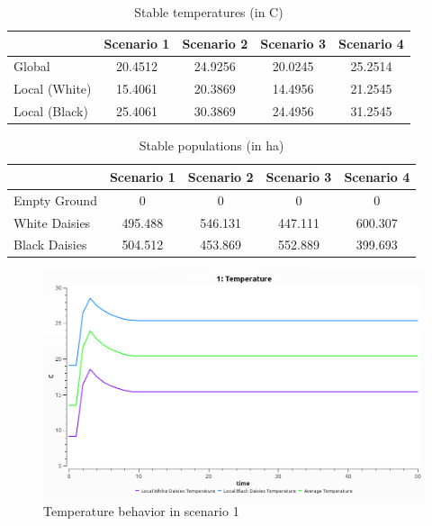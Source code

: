 \documentclass[12pt,a4paper,parskip]{scrartcl}
\begin{document}
\begin{table}
    \centering
    \begin{tabular}{l|c|c|c|c}
                      & Scenario 1 & Scenario 2 & Scenario 3 & Scenario 4\\\hline\hline
        Global        & 20.4512    & 24.9256    & 20.0245    & 25.2514 \\
        Local (White) & 15.4061    & 20.3869    & 14.4956    & 21.2545 \\
        Local (Black) & 25.4061    & 30.3869    & 24.4956    & 31.2545 \\
    \end{tabular}
    \caption{\label{tab:temp}Stable temperatures (in \textdegree C)}
\end{table}


\begin{table}
    \centering
    \begin{tabular}{l|c|c|c|c}
                      & Scenario 1 & Scenario 2 & Scenario 3 & Scenario 4\\\hline\hline
        Empty Ground  & 0       & 0       & 0       & 0       \\
        White Daisies & 495.488 & 546.131 & 447.111 & 600.307 \\
        Black Daisies & 504.512 & 453.869 & 552.889 & 399.693 \\
    \end{tabular}
    \caption{\label{tab:population}Stable populations (in ha)}
\end{table}
\begin{figure}
    \centering
    \includegraphics[width=1\textwidth]{1.png}
    \caption{\label{fig:temp:1}Temperature behavior in scenario 1}
\end{figure}
\end{document}
